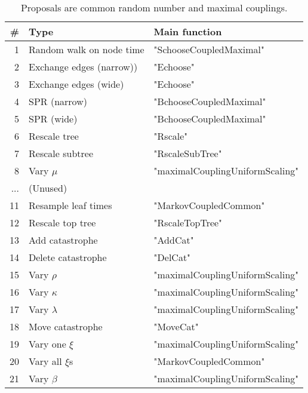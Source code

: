 \documentclass[11pt,a4paper]{article}
\begin{document}
\begin{table}[ht]
    \centering
    \caption{Proposals are \colorbox{myblue!50}{common random number} and \colorbox{mygreen!50}{maximal} couplings.}
    \label{tab:moves}
    \begin{tabular}{@{}rll@{}}
        \toprule
        \# & Type & Main function \\ \midrule
        \rowcolor{mygreen!50}
        1 & Random walk on node time & "SchooseCoupledMaximal" \\
        \rowcolor{myblue!50}
        2 & Exchange edges (narrow)) & "Echoose" \\
        \rowcolor{myblue!50}
        3 & Exchange edges (wide) & "Echoose" \\
        \rowcolor{mygreen!50}
        4 & SPR (narrow) & "BchooseCoupledMaximal"  \\
        \rowcolor{mygreen!50}
        5 & SPR (wide) & "BchooseCoupledMaximal" \\
        \rowcolor{myblue!50}
        6 & Rescale tree & "Rscale"  \\
        \rowcolor{myblue!50}
        7 & Rescale subtree & "RscaleSubTree"  \\
        \rowcolor{mygreen!50}
        8 & Vary $ \mu $ & "maximalCouplingUniformScaling" \\
        ... & \textcolor{black!50}{(Unused)} &   \\
        \rowcolor{myblue!50}
        11 & Resample leaf times & "MarkovCoupledCommon"  \\
        \rowcolor{myblue!50}
        12 & Rescale top tree & "RscaleTopTree" \\
        \rowcolor{myblue!50}
        13 & Add catastrophe & "AddCat" \\
        \rowcolor{myblue!50}
        14 & Delete catastrophe & "DelCat" \\
        \rowcolor{mygreen!50}
        15 & Vary $ \rho $ &  "maximalCouplingUniformScaling" \\
        \rowcolor{mygreen!50}
        16 & Vary $ \kappa $ & "maximalCouplingUniformScaling" \\
        \rowcolor{mygreen!50}
        17 & Vary $ \lambda $ & "maximalCouplingUniformScaling" \\
        \rowcolor{myblue!50}
        18 & Move catastrophe & "MoveCat" \\
        \rowcolor{mygreen!50}
        19 & Vary one $ \xi $ & "maximalCouplingUniformScaling" \\
        \rowcolor{myblue!50}
        20 & Vary all $ \xi $s & "MarkovCoupledCommon"  \\
        \rowcolor{mygreen!50}
        21 & Vary $ \beta $ & "maximalCouplingUniformScaling" \\
        \bottomrule
    \end{tabular}
\end{table}
\end{document}
